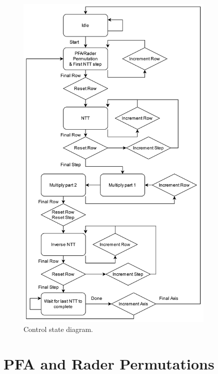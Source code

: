 \documentclass[english,master=eelt,masteroption=ec]{kulemt}
\begin{document}
\begin{figure}[h]
\centering
\includegraphics[width=0.85\textwidth]{img/control_flow.png}
\caption{Control state diagram.}
\label{fig:state_diagram}
\end{figure}

\FloatBarrier

\section{PFA and Rader Permutations}
\end{document}
